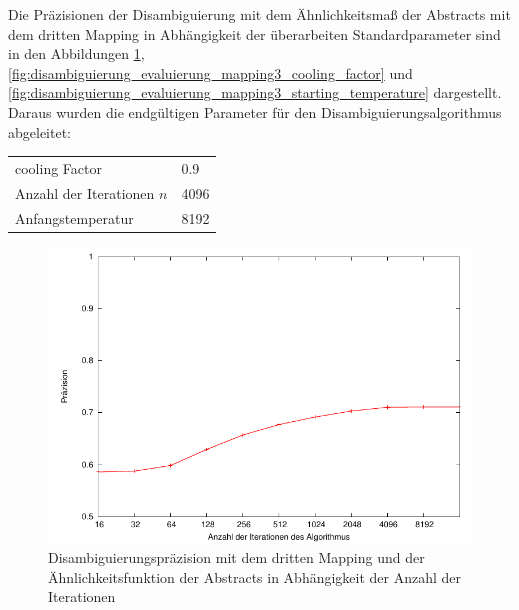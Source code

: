 % 


Die Präzisionen der Disambiguierung mit dem Ähnlichkeitsmaß der Abstracts mit dem dritten Mapping in Abhängigkeit der überarbeiten Standardparameter sind in den Abbildungen
\ref{fig:disambiguierung_evaluierung_mapping3_n}, \ref{fig:disambiguierung_evaluierung_mapping3_cooling_factor} und \ref{fig:disambiguierung_evaluierung_mapping3_starting_temperature} dargestellt.
Daraus wurden die endgültigen Parameter für den Disambiguierungsalgorithmus abgeleitet:

\begin{center}
\begin{tabular}{ll}
\toprule
cooling Factor			&0.9\\
Anzahl der Iterationen $n$	&4096\\
Anfangstemperatur		&8192\\
\bottomrule
\end{tabular}
\end{center}

\begin{figure}[tbh]
\includegraphics[height=0.4\textheight]{img/pdf/mapping3/n.pdf}
\caption[]{Disambiguierungspräzision mit dem dritten Mapping und der Ähnlichkeitsfunktion der Abstracts in Abhängigkeit der Anzahl der Iterationen}
\label{fig:disambiguierung_evaluierung_mapping3_n}
\end{figure}

